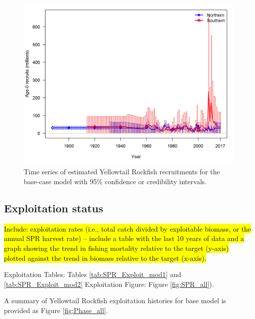 \documentclass[12pt,]{article}
\begin{document}
\FloatBarrier

\begin{figure}[htbp]
\centering
\includegraphics{r4ss/plots_compare/base_compare8_recruits_uncertainty.png}
\caption{Time series of estimated Yellowtail Rockfish recruitments for
the base-case model with 95\% confidence or credibility intervals.
\label{fig:Recruits_all}}
\end{figure}

\FloatBarrier

\subsection*{Exploitation status}\label{exploitation-status}

\hl{Include: exploitation rates (i.e., total catch divided by exploitable biomass, or the annual SPR harvest rate) – include a table with the last 10 years of data and a graph showing the trend in fishing mortality relative to the target (y-axis) plotted against the trend in biomass relative to the target (x-axis).}

Exploitation Tables: Tables \ref{tab:SPR_Exploit_mod1} and
\ref{tab:SPR_Exploit_mod2} Exploitation Figure: Figure
\ref{fig:SPR_all}).

A summary of Yellowtail Rockfish exploitation histories for base model
is provided as Figure \ref{fig:Phase_all}.

\FloatBarrier
\end{document}
